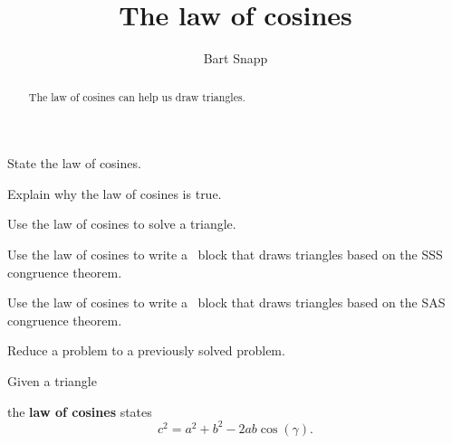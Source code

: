 \documentclass[noauthor,nooutcomes,12pt,handout]{ximera}
\title{The law of cosines}
\author{Bart Snapp}
\begin{document}
\begin{abstract}
   The law of cosines can help us draw triangles.
\end{abstract}
\maketitle

\begin{listOutcomes}
\item State the law of cosines.
\item Explain why the law of cosines is true.
\item Use the law of cosines to solve a triangle.
\item Use the law of cosines to write a \snap\ block that draws triangles
  based on the SSS congruence theorem.
\item Use the law of cosines to write a \snap\ block that draws triangles
  based on the SAS congruence theorem.
\item Reduce a problem to a previously solved problem.
\end{listOutcomes}
\mynewpage

Given a triangle
\begin{center}
\end{center}
the \textbf{law of cosines} states
\[
c^2 = a^2 + b^2 - 2ab\cos(\gamma).
\]
  
\end{document}
